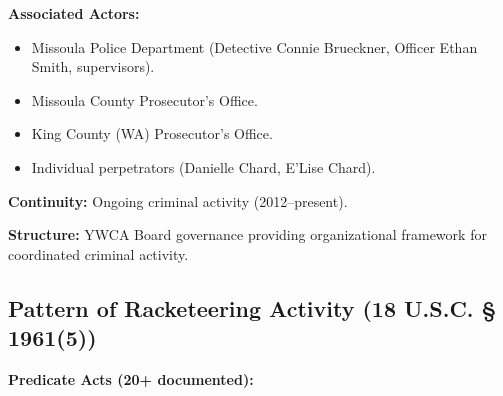 \documentclass[12pt,oneside]{article}
\begin{document}
\begin{flushleft}
\textbf{Associated Actors:}

\begin{itemize}
\item Missoula Police Department (Detective Connie Brueckner, Officer Ethan Smith, supervisors).
\item Missoula County Prosecutor's Office.
\item King County (WA) Prosecutor's Office.
\item Individual perpetrators (Danielle Chard, E'Lise Chard).
\end{itemize}

\textbf{Continuity:} Ongoing criminal activity (2012--present).

\textbf{Structure:} YWCA Board governance providing organizational framework for coordinated criminal activity.

\subsection*{Pattern of Racketeering Activity (18 U.S.C. § 1961(5))}

\textbf{Predicate Acts (20+ documented):}


\end{flushleft}
\end{document}
